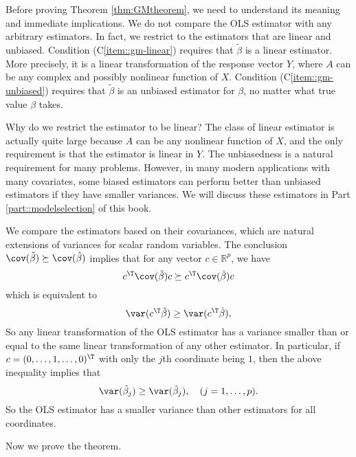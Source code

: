 Before proving Theorem \ref{thm:GMtheorem}, we need to understand its meaning and immediate implications. We do not compare the OLS estimator with any arbitrary estimators. In fact, we restrict to the estimators that are linear and unbiased.  Condition (C\ref{item::gm-linear}) requires that  $\tilde{\beta}$ is a linear estimator. More precisely, it is a linear transformation of the
response vector $Y$, where $A$ can be any complex and possibly nonlinear function of $X$. Condition (C\ref{item::gm-unbiased}) requires that $\tilde{\beta}$  is an unbiased estimator for $\beta$, no matter what true value $\beta$ takes. 



Why do we restrict the estimator to be linear? The class of linear estimator is actually quite large because $A$ can be any nonlinear function of $X$, and the only requirement is that the estimator is linear in $Y$. The unbiasedness is a natural requirement for many problems. However, in many modern applications with many covariates, some biased estimators can perform better than unbiased estimators if they have smaller variances. We will discuss these estimators in Part \ref{part::modelselection} of this book.  


We compare the estimators based on their covariances, which are natural extensions of variances for scalar random variables. The conclusion $\cov(\tilde{\beta}) \succeq  \cov(\hat{\beta})$ implies that for any vector $c  \in \mathbb{R}^p$, we have
$$
c ^{\T}\cov(\tilde{\beta}) c 
\succeq
c ^{\T}  \cov(\hat{\beta})  c  
$$
which is equivalent to
$$
\var(  c ^{\T} \tilde{\beta} ) \geq   \var(c ^{\T}  \hat{\beta}) ,
$$
So any linear transformation of the OLS estimator has a variance smaller than or equal to the same linear transformation of any other estimator. In particular, if $c  = (0,\ldots, 1,\ldots, 0)^{\T}$ with only the $j$th coordinate being $1$, then the above inequality implies that 
$$
\var(\tilde{\beta}_j) \geq 
\var(\hat{\beta}_j)   ,\quad (j=1,\ldots, p).
$$
So the OLS estimator has a smaller variance than other estimators for all coordinates. 

Now we prove the theorem. 

